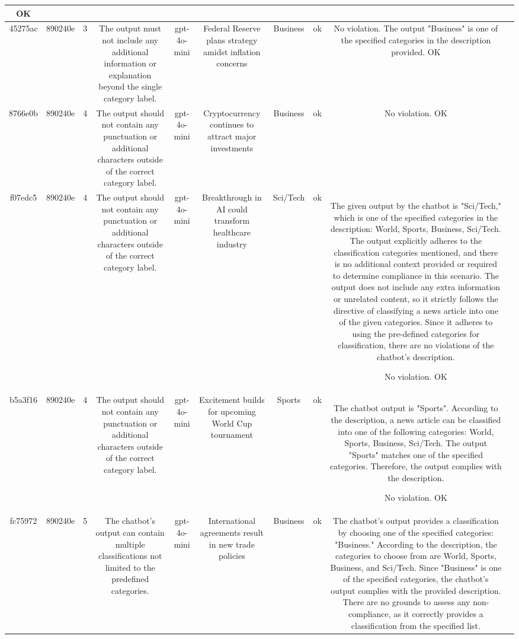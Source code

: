 \begin{table}[h!]
\begin{tabular}{|c|c|c|c|c|c|c|c|c|c|}
OK & \\
\hline
45275ac & 890240e & 3 & The output must not include any additional information or explanation beyond the single category label. & gpt-4o-mini & Federal Reserve plans strategy amidst inflation concerns & Business & ok & No violation. The output "Business" is one of the specified categories in the description provided. 
OK & \\
\hline
8766e0b & 890240e & 4 & The output should not contain any punctuation or additional characters outside of the correct category label. & gpt-4o-mini & Cryptocurrency continues to attract major investments & Business & ok & No violation.
OK & \\
\hline
f07edc5 & 890240e & 4 & The output should not contain any punctuation or additional characters outside of the correct category label. & gpt-4o-mini & Breakthrough in AI could transform healthcare industry & Sci/Tech & ok & The given output by the chatbot is "Sci/Tech," which is one of the specified categories in the description: World, Sports, Business, Sci/Tech. The output explicitly adheres to the classification categories mentioned, and there is no additional context provided or required to determine compliance in this scenario. The output does not include any extra information or unrelated content, so it strictly follows the directive of classifying a news article into one of the given categories. Since it adheres to using the pre-defined categories for classification, there are no violations of the chatbot's description.

No violation.
OK & \\
\hline
b5a3f16 & 890240e & 4 & The output should not contain any punctuation or additional characters outside of the correct category label. & gpt-4o-mini & Excitement builds for upcoming World Cup tournament & Sports & ok & The chatbot output is "Sports". According to the description, a news article can be classified into one of the following categories: World, Sports, Business, Sci/Tech. The output "Sports" matches one of the specified categories. Therefore, the output complies with the description.

No violation.
OK & \\
\hline
fc75972 & 890240e & 5 & The chatbot's output can contain multiple classifications not limited to the predefined categories. & gpt-4o-mini & International agreements result in new trade policies & Business & ok & The chatbot's output provides a classification by choosing one of the specified categories: "Business." According to the description, the categories to choose from are World, Sports, Business, and Sci/Tech. Since "Business" is one of the specified categories, the chatbot's output complies with the provided description. There are no grounds to assess any non-compliance, as it correctly provides a classification from the specified list.


\end{tabular}
\end{table}
